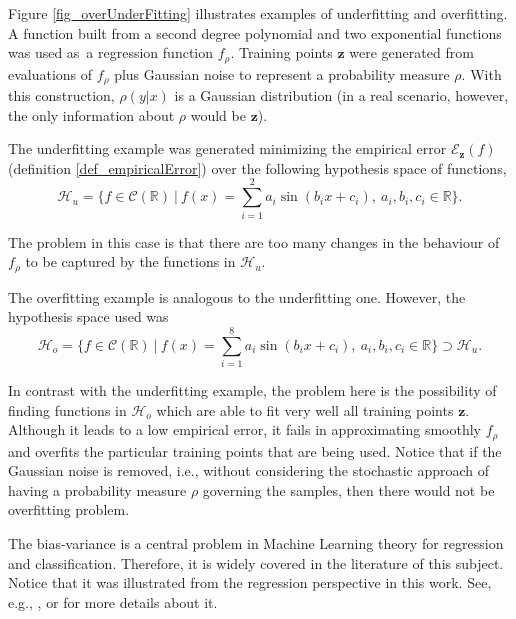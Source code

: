 \begin{example}
Figure \ref{fig_overUnderFitting} illustrates examples of underfitting and overfitting. A function built from a second degree polynomial and two exponential functions was used as a regression function $f_{\rho}$. Training points $\pmb{z}$ were generated from evaluations of $f_{\rho}$ plus Gaussian noise to represent a probability measure $\rho$. With this construction, $\rho(y|x)$ is a Gaussian distribution (in a real scenario, however, the only information about $\rho$ would be $\pmb{z}$).

The underfitting example was generated minimizing the empirical error $\mathcal{E}_{\pmb{z}}(f)$ (definition \ref{def_empiricalError}) over the following hypothesis space of functions,
\begin{equation} \label{eq_Hu}
  \mathcal{H}_u = \{ f \in \mathcal{C}(\mathbb{R}) \ | \ f(x) = \sum_{i=1}^2 a_i\sin(b_i x + c_i), \ a_i,b_i,c_i \in \mathbb{R}  \}.
\end{equation}

The problem in this case is that there are too many changes in the behaviour of $f_{\rho}$ to be captured by the functions in $\mathcal{H}_u$.  

The overfitting example is analogous to the underfitting one. However, the hypothesis space used was
\begin{equation} \label{eq_Ho}
  \mathcal{H}_o = \{ f \in \mathcal{C}(\mathbb{R}) \ | \ f(x) = \sum_{i=1}^8 a_i\sin(b_i x + c_i), \ a_i,b_i,c_i \in \mathbb{R} \} \supset \mathcal{H}_u.
\end{equation}

In contrast with the underfitting example, the problem here is the possibility of finding functions in $\mathcal{H}_o$ which are able to fit very well all training points $\pmb{z}$. Although it leads to a low empirical error, it fails in approximating smoothly $f_{\rho}$ and overfits the particular training points that are being used. Notice that if the Gaussian noise is removed, i.e., without considering the stochastic approach of having a probability measure $\rho$ governing the samples, then there would not be overfitting problem. 
\end{example}

The bias-variance is a central problem in Machine Learning theory for regression and classification. Therefore, it is widely covered in the literature of this subject. Notice that it was illustrated from the regression perspective in this work. See, e.g., \textcite{vonluxburg2008}, \textcite{geman1992} or \textcite{cucker2001} for more details about it.

